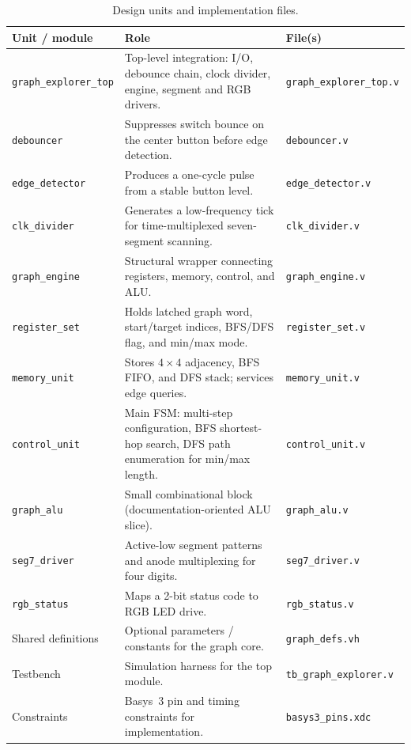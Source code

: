 \documentclass[11pt,a4paper]{article}
\begin{document}
\begin{table}[htbp]
  \centering
  \caption{Design units and implementation files.}
  \label{tab:units}
  \begin{tabular}{@{}p{}p{}p{}@{}}
    \toprule
    \textbf{Unit / module} & \textbf{Role} & \textbf{File(s)} \\
    \midrule
    \texttt{graph\_explorer\_top} &
    Top-level integration: I/O, debounce chain, clock divider, engine, segment and RGB drivers. &
    \texttt{graph\_explorer\_top.v} \\
    \addlinespace
    \texttt{debouncer} &
    Suppresses switch bounce on the center button before edge detection. &
    \texttt{debouncer.v} \\
    \addlinespace
    \texttt{edge\_detector} &
    Produces a one-cycle pulse from a stable button level. &
    \texttt{edge\_detector.v} \\
    \addlinespace
    \texttt{clk\_divider} &
    Generates a low-frequency tick for time-multiplexed seven-segment scanning. &
    \texttt{clk\_divider.v} \\
    \addlinespace
    \texttt{graph\_engine} &
    Structural wrapper connecting registers, memory, control, and ALU. &
    \texttt{graph\_engine.v} \\
    \addlinespace
    \texttt{register\_set} &
    Holds latched graph word, start/target indices, BFS/DFS flag, and min/max mode. &
    \texttt{register\_set.v} \\
    \addlinespace
    \texttt{memory\_unit} &
    Stores $4\times4$ adjacency, BFS FIFO, and DFS stack; services edge queries. &
    \texttt{memory\_unit.v} \\
    \addlinespace
    \texttt{control\_unit} &
    Main FSM: multi-step configuration, BFS shortest-hop search, DFS path enumeration for min/max length. &
    \texttt{control\_unit.v} \\
    \addlinespace
    \texttt{graph\_alu} &
    Small combinational block (documentation-oriented ALU slice). &
    \texttt{graph\_alu.v} \\
    \addlinespace
    \texttt{seg7\_driver} &
    Active-low segment patterns and anode multiplexing for four digits. &
    \texttt{seg7\_driver.v} \\
    \addlinespace
    \texttt{rgb\_status} &
    Maps a 2-bit status code to RGB LED drive. &
    \texttt{rgb\_status.v} \\
    \addlinespace
    Shared definitions &
    Optional parameters / constants for the graph core. &
    \texttt{graph\_defs.vh} \\
    \addlinespace
    Testbench &
    Simulation harness for the top module. &
    \texttt{tb\_graph\_explorer.v} \\
    \addlinespace
    Constraints &
    Basys~3 pin and timing constraints for implementation. &
    \texttt{basys3\_pins.xdc} \\
    \bottomrule
  \end{tabular}
\end{table}
\end{document}
